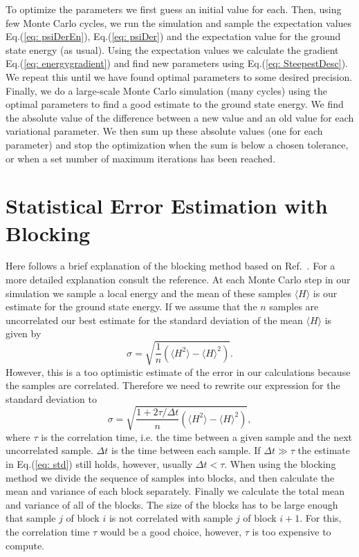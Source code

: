 \documentclass[../main.tex]{subfiles}
\begin{document}
To optimize the parameters we first guess an initial value for each. Then, using few Monte Carlo cycles, we run the simulation and sample the expectation values Eq.(\ref{eq: psiDerEn}), Eq.(\ref{eq: psiDer}) and the expectation value for the ground state energy (as usual). Using the expectation values we calculate the gradient Eq.(\ref{eq: energygradient}) and find new parameters using Eq.(\ref{eq: SteepestDesc}). We repeat this until we have found optimal parameters to some desired precision. Finally, we do a large-scale Monte Carlo simulation (many cycles) using the optimal parameters to find a good estimate to the ground state energy. We find the absolute value of the difference between a new value and an old value for each variational parameter. We then sum up these absolute values (one for each parameter) and stop the optimization when the sum is below a chosen tolerance, or when a set number of maximum iterations has been reached.


\section{Statistical Error Estimation with Blocking}

Here follows a brief explanation of the blocking method based on Ref.~\cite{FYS4411-Slides}. For a more detailed explanation consult the reference.
At each Monte Carlo step in our simulation we sample a local energy and the mean of these samples $\langle H\rangle$ is our estimate for the ground state energy. If we assume that the $n$ samples are uncorrelated our best estimate for the standard deviation of the mean $\langle H\rangle$ is given by
\begin{equation}\label{eq: std}
    \sigma = \sqrt{\frac{1}{n}(\langle H^2\rangle - \langle H\rangle^2)}.
\end{equation}
However, this is a too optimistic estimate of the error in our calculations because the samples are correlated. Therefore we need to rewrite our expression for the standard deviation to
\begin{equation}
    \sigma = \sqrt{\frac{1+2\tau/\Delta t}{n}(\langle H^2\rangle - \langle H\rangle^2)},
\end{equation}
where $\tau$ is the correlation time, i.e. the time between a given sample and the next uncorrelated sample. $\Delta t$ is the time between each sample. If $\Delta t \gg \tau$ the estimate in Eq.(\ref{eq: std}) still holds, however, usually $\Delta t < \tau$. When using the blocking method we divide the sequence of samples into blocks, and then calculate the mean and variance of each block separately. Finally we calculate the total mean and variance of all of the blocks. The size of the blocks has to be large enough that sample $j$ of block $i$ is not correlated with sample $j$ of block $i+1$. For this, the correlation time $\tau$ would be a good choice, however, $\tau$ is too expensive to compute. 
\end{document}
